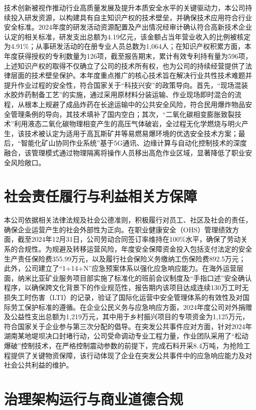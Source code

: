 \documentclass[a4paper,12pt]{article}
\begin{document}
技术创新被视作推动行业高质量发展及提升本质安全水平的关键驱动力，本公司持续投入研发资源，以构建具有自主知识产权的技术壁垒，并确保技术应用符合行业安全标准。2024年度的研发活动资源配置及产出情况经审计确认符合高新技术企业认定的相关标准，研发支出总额为4.19亿元，该金额占当年营业收入的比例被核定为4.91\%；从事研发活动的在册专业人员总数为1,064人；在知识产权积累方面，本年度获得授权的专利数量为126项，截至报告期末，累计有效专利持有量为596项，上述知识产权的取得不仅确立了公司的技术所有权，也为公司的持续经营提供了法律层面的技术壁垒保护。本年度重点推广的核心技术旨在解决行业共性技术难题并提升作业过程的安全性，符合国家关于“科技兴安”的政策导向。首先，“现场混装水胶炸药制备工艺”的实施，通过采用原材料分装运输、作业现场即时混合的流程，从根本上规避了成品炸药在长途运输中的公共安全风险，符合民用爆炸物品安全管理条例的导向，其技术填补了国内空白；其次，“二氧化碳相变膨胀致裂技术”利用液态二氧化碳物理相变产生的高压气体破岩，全过程无化学燃烧与明火产生，该技术被认定为适用于高瓦斯矿井等易燃易爆环境的优选安全技术方案；最后，“智能化矿山协同作业系统”基于5G通讯、边缘计算与自动化控制技术的深度融合，该管理模式通过物理隔离将操作人员移出高危作业区域，显著降低了职业安全风险敞口。

\section{社会责任履行与利益相关方保障}

本公司依据相关法律法规及社会公德准则，积极履行对员工、社区及社会的责任，确保企业运营产生的社会外部性为正向。在职业健康安全（OHS）管理绩效方面，截至2024年12月31日，公司劳动合同签订率维持在100\%水平，确保了劳动关系的合规性。为规避及转移运营风险，年度安全保障资金投入包括支付法定的安全生产责任保险费355.99万元，以及履行社会保险义务缴纳工伤保险费892.5万元；此外，公司建立了“1+14+N”应急预案体系以强化应急响应能力。在海外运营层面，纳米比亚矿业服务项目部实施了标准化的班前会议制度及“手指口述”安全确认程序，以确保跨文化背景下的作业规范性，报告期内该项目达成连续130万工时无损失工时伤害（LTI）的记录，验证了国际化运营中安全管理体系的有效性及对国际劳工保护标准的遵循。在企业公民义务与应急响应方面，2024年度公司对外捐赠及公益性支出总额为1,219万元，其中用于乡村振兴项目的专项资金为1,125万元，符合国家关于企业参与第三次分配的倡导。在突发公共事件应对方面，针对2024年湖南某地堤坝决口封堵行动，公司受命调动专业工程力量，作业团队采用了“松动爆破”控制技术，在严格控制震动参数的前提下，完成石料开采8.4万吨，为抢险工程提供了关键物资保障，该行动体现了企业在突发公共事件中的应急响应能力及对社会公共利益的维护。

\section{治理架构运行与商业道德合规}
\end{document}
